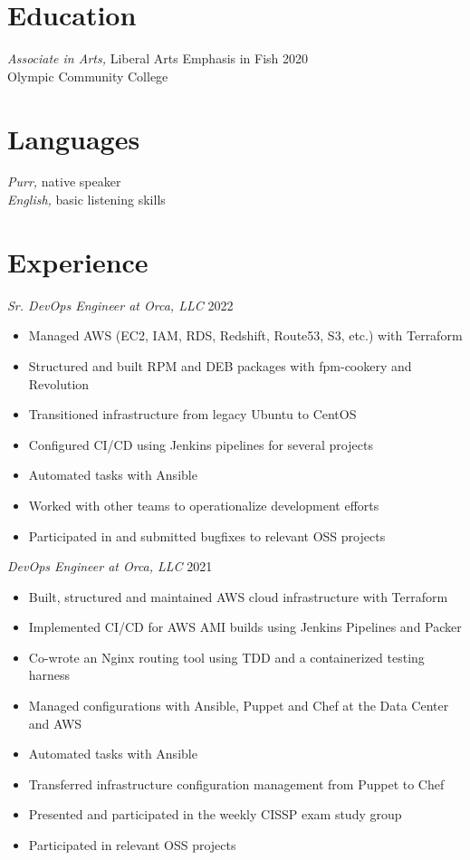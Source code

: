 \documentclass[line]{docs/resume/res}
\begin{document}
\address{https://devopscat.com}
\address{Email: me@devopscat.com}

\begin{resume}

\section{Education}
  {\sl Associate in Arts,} Liberal Arts Emphasis in Fish \hfill 2020 \\
  Olympic Community College

\section{Languages}
  {\sl Purr,} native speaker \\
  {\sl English,} basic listening skills

\section{Experience}
  {\sl Sr. DevOps Engineer at Orca, LLC} \hfill 2022
  \begin{itemize} \itemsep -2pt %
    \item Managed AWS (EC2, IAM, RDS, Redshift, Route53, S3, etc.) with Terraform
    \item Structured and built RPM and DEB packages with fpm-cookery and Revolution
    \item Transitioned infrastructure from legacy Ubuntu to CentOS
    \item Configured CI/CD using Jenkins pipelines for several projects
    \item Automated tasks with Ansible
    \item Worked with other teams to operationalize development efforts
    \item Participated in and submitted bugfixes to relevant OSS projects
  \end{itemize}

  {\sl DevOps Engineer at Orca, LLC} \hfill 2021
  \begin{itemize} \itemsep -2pt %
    \item Built, structured and maintained AWS cloud infrastructure with Terraform
    \item Implemented CI/CD for AWS AMI builds using Jenkins Pipelines and Packer
    \item Co-wrote an Nginx routing tool using TDD and a containerized testing harness
    \item Managed configurations with Ansible, Puppet and Chef at the Data Center and AWS
    \item Automated tasks with Ansible
    \item Transferred infrastructure configuration management from Puppet to Chef
    \item Presented and participated in the weekly CISSP exam study group
    \item Participated in relevant OSS projects
  \end{itemize}


\end{resume}
\end{document}
